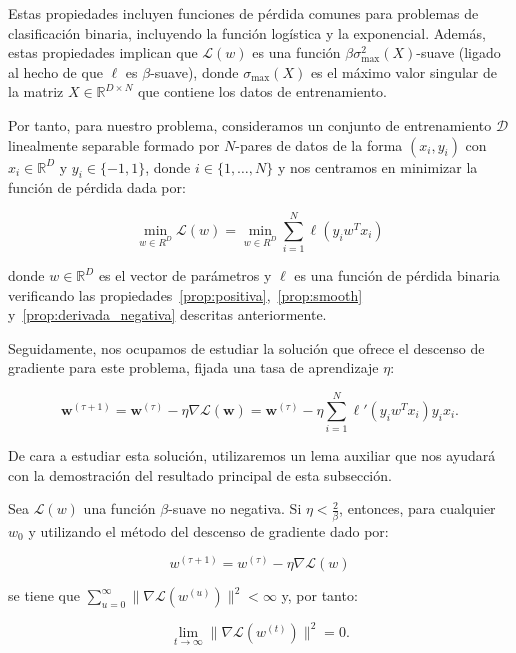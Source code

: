 Estas propiedades incluyen funciones de pérdida comunes para problemas de clasificación binaria, incluyendo la función logística y la exponencial. Además, estas propiedades implican que $\mathcal{L}(w)$ es una función $\beta \sigma^{2}_{\max}(X)$-suave (ligado al hecho de que $\ell$ es $\beta$-suave), donde $\sigma_{\max}(X)$ es el máximo valor singular de la matriz $X \in \mathbb{R}^{D \times N}$ que contiene los datos de entrenamiento.\newline

Por tanto, para nuestro problema, consideramos un conjunto de entrenamiento $\mathcal{D}$ linealmente separable formado por $N$-pares de datos de la forma $(x_i, y_i)$ con $x_i \in \mathbb{R}^{D}$ y $y_i \in \{ -1, 1\}$, donde $i \in \{1, \ldots, N \}$ y nos centramos en minimizar la función de pérdida dada por:

\[
    \min_{w \in R^{D}}\mathcal{L}(w) = \min_{w \in R^{D}} \sum_{i=1}^{N} \ell(y_i w^{T}x_i)
\]

donde $w \in \mathbb{R}^{D}$ es el vector de parámetros y $\ell$ es una función de pérdida binaria verificando las propiedades~\ref{prop:positiva},~\ref{prop:smooth} y~\ref{prop:derivada_negativa} descritas anteriormente.\newline

Seguidamente, nos ocupamos de estudiar la solución que ofrece el descenso de gradiente para este problema, fijada una tasa de aprendizaje $\eta$:

\[
    \mathbf{w}^{(\tau + 1)} = \mathbf{w}^{(\tau)} - \eta \nabla \mathcal{L}(\mathbf{w}) = \mathbf{w}^{(\tau)} - \eta \sum_{i=1}^{N} \ell'(y_i w^{T}x_i)y_i x_i.
\]\newline

De cara a estudiar esta solución, utilizaremos un lema auxiliar que nos ayudará con la demostración del resultado principal de esta subsección.
\begin{lema}\label{lema:raro-clasificación-gd}
    Sea $\mathcal{L}(w)$ una función $\beta$-suave no negativa. Si $\eta < \frac{2}{\beta}$, entonces, para cualquier $w_0$ y utilizando el método del descenso de gradiente dado por:

    \[
        w^{(\tau + 1)} = w^{(\tau)} - \eta \nabla \mathcal{L}(w)
    \]

    se tiene que $\sum_{u=0}^{\infty} \| \nabla\mathcal{L}(w^{(u)}) \|^{2} < \infty$ y, por tanto:

    \[
        \lim \limits_{t \to \infty} \| \nabla\mathcal{L}(w^{(t)}) \|^{2} = 0.
    \]
\end{lema}

